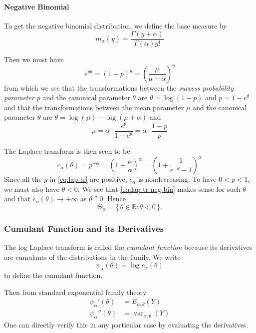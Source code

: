 \documentclass[11pt]{article}
\DeclareMathOperator{\var}{var}
\newcommand{\real}{\mathbb{R}}
\newcommand{\set}[1]{\{\, #1 \,\}}
\begin{document}
\paragraph{Negative Binomial}

To get the negative binomial distribution, we define the base measure by
$$
   m_\alpha(y) = \frac{\Gamma(y + \alpha)}{\Gamma(\alpha) y !}
$$

Then we must have
$$
   e^{y \theta} = (1 - p)^y = \left( \frac{\mu}{\mu + \alpha} \right)^y
$$
from which we see that the transformations between
the \emph{success probability parameter $p$} and the
canonical parameter $\theta$ are $\theta = \log(1 - p)$ and $p = 1 - e^\theta$
and that the transformations between the mean parameter $\mu$ and
the canonical parameter $\theta$ are $\theta = \log(\mu) - \log(\mu + \alpha)$
and
\begin{equation} \label{eq:theta-to-mu-neg-bin}
   \mu
   =
   \alpha \cdot \frac{e^\theta}{1 - e^\theta}
   =
   \alpha \cdot \frac{1 - p}{p}
\end{equation}

The Laplace transform is then seen to be
\begin{equation} \label{eq:lap-tr-neg-bin}
   c_\alpha(\theta) = p^{- \alpha}
   = \left(1 + \frac{\mu}{\alpha} \right)^\alpha
   = \left(1 + \frac{1}{e^{- \theta} - 1} \right)^\alpha
\end{equation}
Since all the $y$ in \eqref{eq:lap-tr} are positive, $c_\alpha$ is
nondecreasing.
To have $0 < p < 1$, we must also have $\theta < 0$.  We see
that \eqref{eq:lap-tr-neg-bin} makes sense for such $\theta$ and
that $c_\alpha(\theta) \to + \infty$ as $\theta \uparrow 0$.
Hence
$$
   \Theta_\alpha = \set{ \theta \in \real : \theta < 0 }.
$$

\subsubsection{Cumulant Function and its Derivatives}

The log Laplace transform is called the \emph{cumulant function} because
its derivatives are cumulants of the distributions in the family.
We write
$$
   \psi_\alpha(\theta) = \log c_\alpha(\theta)
$$
to define the cumulant function.

Then from standard exponential family theory
\begin{align*}
   \psi_\alpha'(\theta) & = E_{\alpha, \theta}(Y)
   \\
   \psi_\alpha''(\theta) & = \var_{\alpha, \theta}(Y)
\end{align*}
One can directly verify this in any particular case by evaluating the
derivatives.
\end{document}
